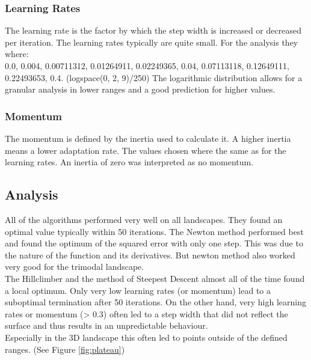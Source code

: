 \documentclass{scrartcl}
\begin{document}
\subsubsection{Learning Rates}
The learning rate is the factor by which the step width is increased or decreased per iteration. The learning rates typically are quite small. For the analysis they where:\\
 0.0,  0.004,  0.00711312,  0.01264911, 0.02249365, 0.04,  0.07113118,  0.12649111,  0.22493653,  0.4.  (logspace(0, 2, 9)/250)
 The logarithmic distribution allows for a granular analysis in lower ranges and a good prediction for higher values.
\subsubsection{Momentum}
The momentum is defined by the inertia used to calculate it. A higher inertia means a lower adaptation rate. The values chosen where the same as for the learning rates. An inertia of zero was interpreted as no momentum.

\subsection{Analysis}
All of the algorithms performed very well on all landscapes. They found an optimal value typically within 50 iterations. The Newton method performed best and found the optimum of the squared error with only one step. This was due to the nature of the function and its derivatives. But newton method also worked very good for the trimodal landscape.\\
The Hillclimber and the method of Steepest Descent almost all of the time found a local optimum. Only very low learning rates (or momentum) lead to a suboptimal termination after 50 iterations. On the other hand, very high learning rates or momentum (> 0.3) often led to a step width that did not reflect the surface and thus results in an unpredictable behaviour.\\
Especially in the 3D landscape this often led to points outside of the defined ranges. (See Figure \ref{fig:plateau})
\end{document}
